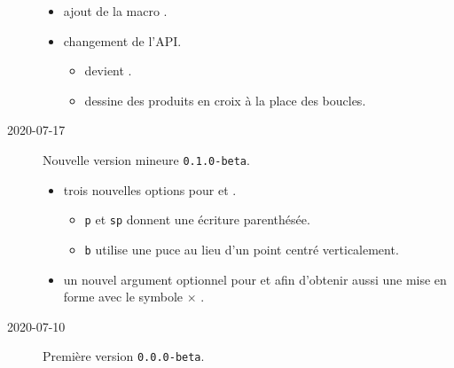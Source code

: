\documentclass[12pt,a4paper]{article}
\begin{document}
\begin{description}
    \begin{itemize}[itemsep=.5em]
        \item {}
              ajout de la macro .
    
    
        \item {} changement de l'API.
        \begin{itemize}[itemsep=.5em]
            \item {} devient .
    
            \item {} dessine des produits en croix à la place des boucles.
        \end{itemize}
    
    
    \end{itemize}
    
    \separation


    \medskip
    \item[2020-07-17] Nouvelle version mineure \verb+0.1.0-beta+.
    
    \begin{itemize}[itemsep=.5em]
        \item {}
              trois nouvelles options pour  et .
        \begin{itemize}[itemsep=.5em]
            \item \verb+p+ et \verb+sp+ donnent une écriture parenthésée.
    
            \item \verb+b+ utilise une puce au lieu d'un point centré verticalement.
        \end{itemize}
    
    
        \item {}
              un nouvel argument optionnel pour  et  afin d'obtenir aussi une mise en forme avec le symbole $\times$ .
    \end{itemize}
    
    \separation


    \medskip
    \item[2020-07-10] Première version \verb+0.0.0-beta+.

\end{description}
\end{document}

